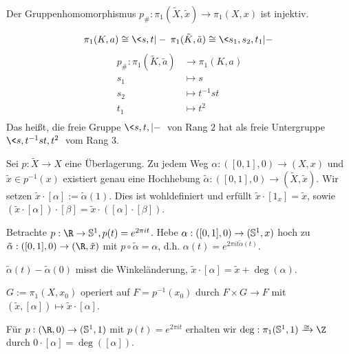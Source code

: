 \begin{kor}
	Der Gruppenhomomorphismus $p_\#: \pi_1(\tilde X, \tilde x) \to \pi_1 (X, x)$ ist injektiv.
\end{kor}

\begin{ex}
	\[
		\pi_1(K, a) \isomorphic \<s, t | -\>
		\pi_1(\tilde K, \tilde a) \isomorphic \<s_1, s_2, t_1 | -\>
	\]
	\begin{align*}
		p_\#: \pi_1(\tilde K, \tilde a) &\to \pi_1(K, a) \\
		s_1 &\mapsto s \\
		s_2 &\mapsto t^{-1}st \\
		t_1 &\mapsto t^2 \\
	\end{align*}
	Das heißt, die freie Gruppe $\<s,t,| -\>$ von Rang $2$ hat als freie Untergruppe $\<s, t^{-1}st, t^2\>$ vom Rang $3$.
\end{ex}

\begin{st}
	Sei $p: \tilde X \to X$ eine Überlagerung.
	Zu jedem Weg $\alpha: ([0,1], 0) \to (X, x)$ und $\tilde x \in p^{-1}(x)$ existiert genau eine Hochhebung $\tilde \alpha: ([0,1], 0) \to (\tilde X, \tilde x)$.
	Wir setzen $\tilde x \cdot [\alpha] := \tilde \alpha (1)$.
	Dies ist wohldefiniert und erfüllt $\tilde x \cdot [1_x] = \tilde x$, sowie $(\tilde x \cdot [\alpha]) \cdot [\beta] = \tilde x \cdot ([\alpha] \cdot [\beta])$.
\end{st}

\begin{ex}
	Betrachte $p: \R \to \S^1, p(t) = e^{2\pi i t}$.
	Hebe $\alpha: ([0,1], 0) \to (\S^1, x)$ hoch zu $\tilde \alpha: ([0,1], 0) \to (\R, \tilde x)$ mit $p \circ \tilde \alpha = \alpha$, d.h. $\alpha(t) = e^{2\pi i t \tilde \alpha(t)}$.

	$\tilde \alpha(t) - \tilde \alpha(0)$ misst die Winkeländerung, $\tilde x \cdot [\alpha] = \tilde x + \deg(\alpha)$.
\end{ex}

\begin{kor}
	$G := \pi_1(X, x_0)$ operiert auf $F = p^{-1}(x_0)$ durch $F \times G \to F$ mit $(\tilde x, [\alpha]) \mapsto \tilde x \cdot [\alpha]$.
\end{kor}

\begin{st}
	Für $p: (\R, 0) \to (\S^1, 1)$ mit $p(t) = e^{2\pi i t}$ erhalten wir $\deg: \pi_1 (\S^1, 1) \homeomorphicto \Z$ durch $0 \cdot [\alpha] = \deg([\alpha])$.
\end{st}

